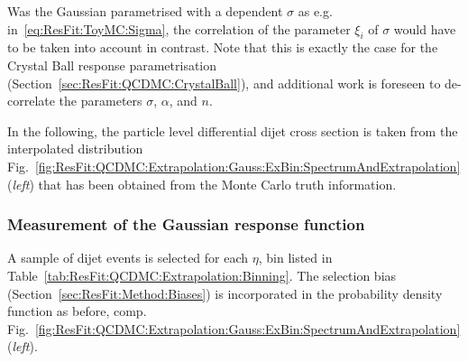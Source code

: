 Was the Gaussian parametrised with a \pt dependent $\sigma$ as e.g. in~\eqref{eq:ResFit:ToyMC:Sigma}, the correlation of the parameter $\xi_{i}$ of $\sigma$ would have to be taken into account in contrast.
Note that this is exactly the case for the Crystal Ball response parametrisation (Section~\ref{sec:ResFit:QCDMC:CrystalBall}), and additional work is foreseen to de-correlate the parameters $\sigma$, $\alpha$, and $n$.

In the following, the particle level differential dijet cross section is taken from the interpolated \ptparticle distribution Fig.~\ref{fig:ResFit:QCDMC:Extrapolation:Gauss:ExBin:SpectrumAndExtrapolation} (\textit{left}) that has been obtained from the Monte Carlo truth information. 



\subsubsection{Measurement of the Gaussian response function}\label{sec:ResFit:QCDMC:Gauss}

A sample of dijet events is selected for each $\eta$, \pt bin listed in Table~\ref{tab:ResFit:QCDMC:Extrapolation:Binning}.
The selection bias (Section~\ref{sec:ResFit:Method:Biases}) is incorporated in the probability density function as before, comp. Fig.~\ref{fig:ResFit:QCDMC:Extrapolation:Gauss:ExBin:SpectrumAndExtrapolation} (\textit{left}).

